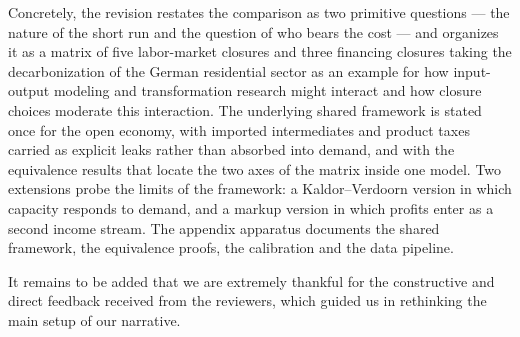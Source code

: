 Concretely, the revision restates the comparison as two primitive questions --- the
nature of the short run and the question of who bears the cost --- and organizes it
as a matrix of five labor-market closures and three financing closures taking the decarbonization of the German residential sector as an example for how input-output modeling and transformation research might interact and how closure choices moderate this interaction. The underlying shared framework is stated once for the open economy, with imported intermediates and product taxes carried as explicit leaks rather than absorbed into demand, and with the equivalence results that locate the two axes of the matrix inside one model. Two extensions probe the limits of the framework: a Kaldor--Verdoorn version in which capacity responds to demand, and a markup version in which profits enter as a second income stream. The appendix apparatus documents the shared framework, the equivalence proofs, the calibration and the data pipeline.

It remains to be added that we are extremely thankful for the constructive and direct
feedback received from the reviewers, which guided us in rethinking the main
setup of our narrative.
